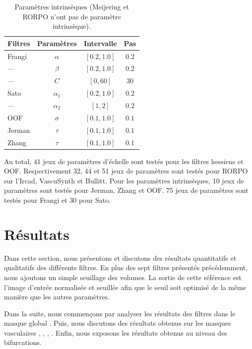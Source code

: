 \begin{table}[H]
  \caption{Paramètres intrinsèques (Meijering et RORPO n'ont pas de paramètre intrinsèque).}
  \label{table:PS_interval}
  \begin{center}
    \begin{tabular}{  l  c  c  c }
      \hline
      Filtres & Paramètres & Intervalle & Pas \\
      \hline
      Frangi & $\alpha$ & $[0.2,1.0]$ & $0.2$ \\
      ---       & $\beta$ & $[0.2,1.0]$ & $0.2$  \\
      ---       & $C$& $[0,60]$ & $30$ \\
      Sato & $\alpha_{1}$ & $[0.2,1.0]$ & $0.2$ \\
      ---     & $\alpha_{2}$ & $[1,2]$ & $0.2$ \\
      OOF & $\sigma$ & $[0.1,1.0]$ & $0.1$ \\
      Jerman & $\tau$ & $[0.1,1.0]$ & $0.1$ \\
      Zhang & $\tau$& $[0.1,1.0]$ & $0.1$ \\
      \hline
    \end{tabular}
  \end{center}
\end{table}
  
Au total, 41 jeux de paramètres d'échelle sont testés pour les filtres hessiens et OOF. Respectivement 32, 44 et 51 jeux de paramètres sont testés pour RORPO sur l'Ircad, VascuSynth et Bullitt. Pour les paramètres intrinsèques, 10 jeux de paramètres sont testés pour Jerman, Zhang et OOF. 75 jeux de paramètres sont testés pour Frangi et 30 pour Sato.


\section{Résultats}

Dans cette section, nous présentons et discutons des résultats quantitatifs et qualitatifs des différents filtres. En plus des sept filtres présentés précédemment, nous ajoutons un simple seuillage des volumes. La sortie de cette référence est l'image d'entrée normalisée et seuillée afin que le seuil soit optimisé de la même manière que les autres paramètres.

Dans la suite, nous commençons par analyser les résultats des filtres dans le masque global \maskglobal. Puis, nous discutons des résultats obtenus sur les masques vasculaires \maskvascular, \maskvesselLarge, \maskvesselMedium, \maskvesselSmall. Enfin, nous exposons les résultats obtenus au niveau des bifurcations.


